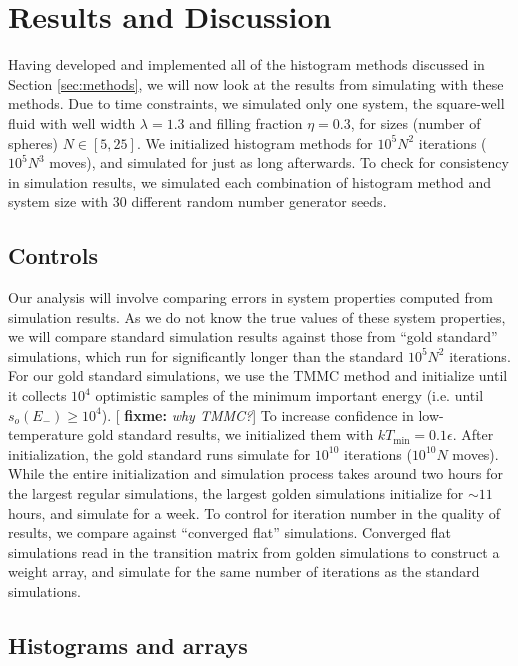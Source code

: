 \documentclass[11pt]{article}
\renewcommand{\t}{\text} %
\newcommand{\p}[1]{\left(#1\right)} %
\renewcommand{\sp}[1]{\left[#1\right]} %
\newcommand{\red}[1]{{\bf \color{red} #1}}
\newcommand{\fixme}[1]{[\red{fixme:} \emph{#1}]}
\begin{document}
\section{Results and Discussion}
\label{sec:results}

Having developed and implemented all of the histogram methods
discussed in Section \ref{sec:methods}, we will now look at the
results from simulating with these methods. Due to time constraints,
we simulated only one system, the square-well fluid with well width
$\lambda=1.3$ and filling fraction $\eta=0.3$, for sizes (number of
spheres) $N\in\sp{5,25}$. We initialized histogram methods for
$10^5N^2$ iterations ($10^5N^3$ moves), and simulated for just as long
afterwards. To check for consistency in simulation results, we
simulated each combination of histogram method and system size with 30
different random number generator seeds.

\subsection{Controls}
\label{sec:controls}

Our analysis will involve comparing errors in system properties
computed from simulation results. As we do not know the true values of
these system properties, we will compare standard simulation results
against those from ``gold standard'' simulations, which run for
significantly longer than the standard $10^5N^2$ iterations. For our
gold standard simulations, we use the TMMC method and initialize until
it collects $10^4$ optimistic samples of the minimum important energy
(i.e. until $s_o\p{E_-}\ge 10^4$). \fixme{why TMMC?} To increase
confidence in low-temperature gold standard results, we initialized
them with $kT_{\t{min}}=0.1\epsilon$. After initialization, the gold
standard runs simulate for $10^{10}$ iterations ($10^{10}N$
moves). While the entire initialization and simulation process takes
around two hours for the largest regular simulations, the largest
golden simulations initialize for $\sim11$ hours, and simulate for a
week. To control for iteration number in the quality of results, we
compare against ``converged flat'' simulations. Converged flat
simulations read in the transition matrix from golden simulations to
construct a weight array, and simulate for the same number of
iterations as the standard simulations.

\subsection{Histograms and arrays}
\label{sec:histograms}
\end{document}
